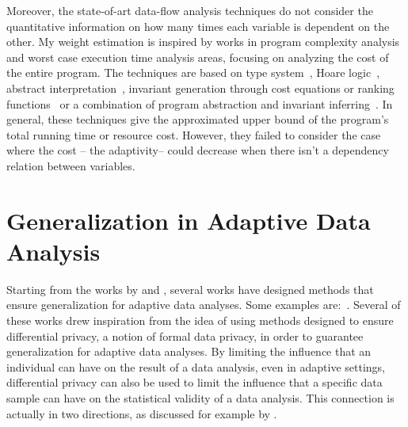Moreover, the state-of-art data-flow analysis techniques do not
consider the quantitative information on how many times each variable is dependent on the other. 
My weight estimation is inspired by
 works in program complexity analysis and worst case execution time analysis areas, 
 focusing on analyzing the cost of the entire program. 
The techniques are based on
type system~\cite{CicekBG0H17, RajaniG0021}, Hoare logic~\cite{CarbonneauxHS15}, abstract interpretation~\cite{GustafssonEL05, HumenbergerJK18},
invariant generation through cost equations or ranking functions~\cite{BrockschmidtEFFG16,AlbertAGP08,AliasDFG10,Flores-MontoyaH14}
or a combination of program abstraction and invariant inferring~\cite{GulwaniZ10, SinnZV17,GulwaniJK09}.
In general, these techniques give the approximated upper bound of the program's total running time or resource cost.
However, they failed to consider the case where the cost -- the adaptivity-- could decrease when there isn't a dependency relation between variables.

\section{Generalization in Adaptive Data Analysis}
\label{sec:relatedwork-adapt-error}
Starting from the works by \citet{DworkFHPRR15} and \citet{HardtU14}, several works have designed methods that ensure generalization for adaptive data analyses.
Some examples
are:~\cite{dwork2015reusable,dwork2015generalization,
BassilyNSSSU16,UllmanSNSS18,FeldmanS17,jung2019new,SteinkeZ20,RogersRSSTW20}.
Several of these works drew inspiration from the idea of using methods designed to ensure differential privacy, a notion of formal data privacy, in order to guarantee generalization for adaptive data analyses.
By limiting the influence that an individual can have on the result of a data analysis, even in adaptive settings, differential privacy can also be used to limit the influence that a specific data sample can have on the statistical validity of a data analysis.
This connection is actually in two directions, as discussed for example by \citet{YeomGFJ18}.

